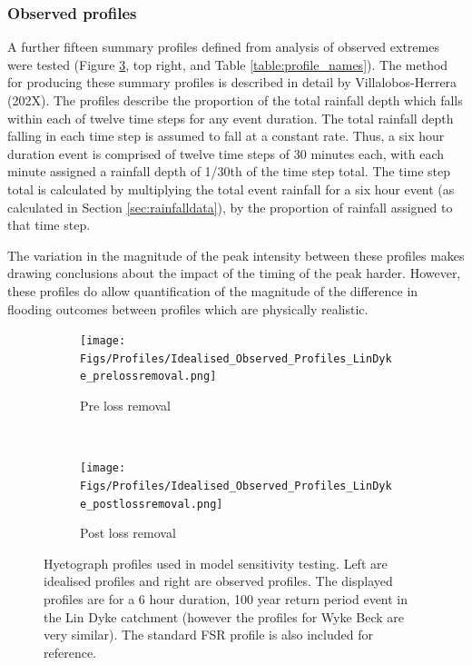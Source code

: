 \documentclass[APA,Times2COL]{WileyNJDv5}
\begin{document}
\subsubsection{Observed profiles}
A further fifteen summary profiles defined from analysis of observed extremes were tested (Figure \ref{fig:profiles}, top right, and Table \ref{table:profile_names}). The method for producing these summary profiles is described in detail by Villalobos-Herrera (202X). The profiles describe the proportion of the total rainfall depth which falls within each of twelve time steps for any event duration. The total rainfall depth falling in each time step is assumed to fall at a constant rate. Thus, a six hour duration event is comprised of twelve time steps of 30 minutes each, with each minute assigned a rainfall depth of 1/30th of the time step total. The time step total is calculated by multiplying the total event rainfall for a six hour event (as calculated in Section \ref{sec:rainfalldata}), by the proportion of rainfall assigned to that time step.  

The variation in the magnitude of the peak intensity between these profiles makes drawing conclusions about the impact of the timing of the peak harder. However, these profiles do allow quantification of the magnitude of the difference in flooding outcomes between profiles which are physically realistic. 


\begin{figure}[!t] 
\centering
\begin{subfigure}[H]{\linewidth}
   \centering
   \texttt{[image: Figs/Profiles/Idealised\_Observed\_Profiles\_LinDyke\_prelossremoval.png]}
   \caption{Pre loss removal}
   \label{fig:prelossremovalprofiles}
\end{subfigure}
\\[\baselineskip]
\begin{subfigure}{\linewidth}
   \centering
   \texttt{[image: Figs/Profiles/Idealised\_Observed\_Profiles\_LinDyke\_postlossremoval.png]}
   \caption{Post loss removal }
   \label{fig:postlossremovalprofiles} 
\end{subfigure}
\hfill
\centering
\caption{Hyetograph profiles used in model sensitivity testing. Left are idealised profiles and right are observed profiles. The displayed profiles are for a 6 hour duration, 100 year return period event in the Lin Dyke catchment (however the profiles for Wyke Beck are very similar). The standard FSR profile is also included for reference.} \label{fig:profiles} 
\end{figure}
\end{document}
